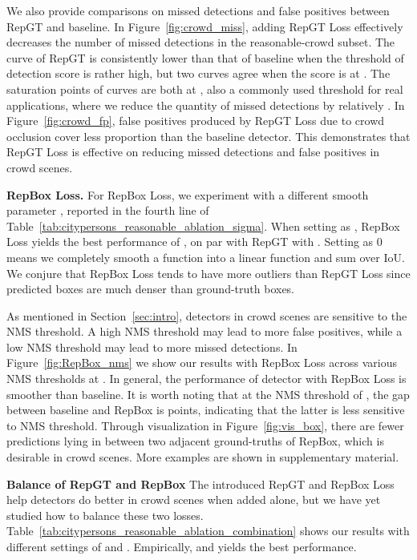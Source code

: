 \documentclass[10pt,twocolumn,letterpaper]{article}
\newcommand{\myparagraph}[1]{{\vspace{0.5em} \noindent \bf #1}}
\begin{document}
We also provide comparisons on missed detections and false positives between RepGT and baseline. In Figure~\ref{fig:crowd_miss}, adding RepGT Loss effectively decreases the number of missed detections in the reasonable-crowd subset. The curve of RepGT is consistently lower than that of baseline when the threshold of detection score is rather high, but two curves agree when the score is at . The saturation points of curves are both at , also a commonly used threshold for real applications, where we reduce the quantity of missed detections by relatively . In Figure~\ref{fig:crowd_fp}, false positives produced by RepGT Loss due to crowd occlusion cover less proportion than the baseline detector. This demonstrates that RepGT Loss is effective on reducing missed detections and false positives in crowd scenes.

\myparagraph{RepBox Loss.} For RepBox Loss, we experiment with a different smooth parameter , reported in the fourth line of Table~\ref{tab:citypersons_reasonable_ablation_sigma}. When setting  as , RepBox Loss yields the best performance of  , on par with RepGT with . Setting  as 0 means we completely smooth a  function into a linear function and sum over IoU. We conjure that RepBox Loss tends to have more outliers than RepGT Loss since predicted boxes are much denser than ground-truth boxes.

As mentioned in Section~\ref{sec:intro}, detectors in crowd scenes are sensitive to the NMS threshold. A high NMS threshold may lead to more false positives, while a low NMS threshold may lead to more missed detections. In Figure~\ref{fig:RepBox_nms} we show our results with RepBox Loss across various NMS thresholds at . In general, the performance of detector with RepBox Loss is smoother than baseline. It is worth noting that at the NMS threshold of , the gap between baseline and RepBox is  points, indicating that the latter is less sensitive to NMS threshold. Through visualization in Figure~\ref{fig:vis_box}, there are fewer predictions lying in between two adjacent ground-truths of RepBox, which is desirable in crowd scenes. More examples are shown in supplementary material.

\myparagraph{Balance of RepGT and RepBox}
The introduced RepGT and RepBox Loss help detectors do better in crowd scenes when added alone, but we have yet studied how to balance these two losses.  Table~\ref{tab:citypersons_reasonable_ablation_combination} shows our results with different settings of  and . Empirically,  and  yields the best performance.
\end{document}
